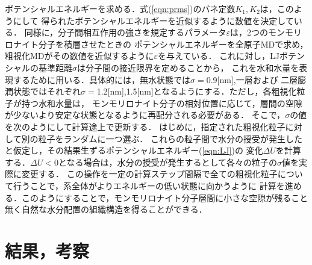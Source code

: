 ﻿\documentclass[11pt,a4j]{jarticle}
\begin{document}
ポテンシャルエネルギーを求める．式(\ref{eqn:prms})のバネ定数$K_1, K_2$は，このようにして
得られたポテンシャルエネルギーを近似するように数値を決定している．
同様に，分子間相互作用の強さを規定するパラメータ$\varepsilon$は，2つのモンモリロナイト分子を積層させたときの
ポテンシャルエネルギーを全原子MDで求め，粗視化MDがその数値を近似するように$\varepsilon$を与えている．
これに対し，LJポテンシャルの基準距離$\sigma$は分子間の接近限界を定めることから，
これを水和水量を表現するために用いる．具体的には，無水状態では$\sigma=$0.9[nm],一層および
二層膨潤状態ではそれぞれ$\sigma=$1.2[nm],1.5[nm]となるようにする．ただし，各粗視化粒子が持つ水和水量は，
モンモリロナイト分子の相対位置に応じて，層間の空隙が少ないより安定な状態となるように再配分される必要がある．
そこで，$\sigma$の値を次のようにして計算途上で更新する．
はじめに，指定された粗視化粒子に対して別の粒子をランダムに一つ選ぶ．
これらの粒子間で水分の授受が発生したと仮定し，その結果生ずるポテンシャルエネルギー(\ref{eqn:LJ})の
変化$\Delta U$を計算する．$\Delta U<0$となる場合は，水分の授受が発生するとして各々の粒子の$\sigma$値を実際に変更する．
この操作を一定の計算ステップ間隔で全ての粗視化粒子について行うことで，系全体がよりエネルギーの低い状態に向かうように
計算を進める．このようにすることで，モンモリロナイト分子層間に小さな空隙が残ること無く自然な水分配置の組織構造を得ることができる．
\section{結果，考察}
\end{document}
